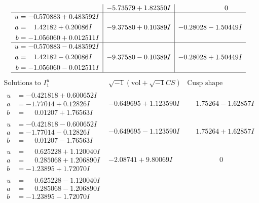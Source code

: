 \documentclass[1p]{elsarticle_modified}
\theoremstyle{definition}
\newcommand{\I}{\sqrt{-1}}
\begin{document}
$$\begin{array}{c|c|c}
 & -5.73579 + 1.82350 I & \phantom{-0.000000 } 0 \\ \hline\begin{aligned}
u &= -0.570883 + 0.483592 I \\
a &= \phantom{-}1.42182 + 0.20086 I \\
b &= -1.056060 + 0.012511 I\end{aligned}
 & -9.37580 + 0.10389 I & -0.28028 - 1.50449 I \\ \hline\begin{aligned}
u &= -0.570883 - 0.483592 I \\
a &= \phantom{-}1.42182 - 0.20086 I \\
b &= -1.056060 - 0.012511 I\end{aligned}
 & -9.37580 - 0.10389 I & -0.28028 + 1.50449 I\\
 \hline 
 \end{array}$$\newpage$$\begin{array}{c|c|c}  
\text{Solutions to }I^u_{1}& \I (\text{vol} + \sqrt{-1}CS) & \text{Cusp shape}\\
 \hline 
\begin{aligned}
u &= -0.421818 + 0.600652 I \\
a &= -1.77014 + 0.12826 I \\
b &= \phantom{-}0.01207 + 1.76563 I\end{aligned}
 & -0.649695 + 1.123590 I & \phantom{-}1.75264 - 1.62857 I \\ \hline\begin{aligned}
u &= -0.421818 - 0.600652 I \\
a &= -1.77014 - 0.12826 I \\
b &= \phantom{-}0.01207 - 1.76563 I\end{aligned}
 & -0.649695 - 1.123590 I & \phantom{-}1.75264 + 1.62857 I \\ \hline\begin{aligned}
u &= \phantom{-}0.625228 + 1.120040 I \\
a &= \phantom{-}0.285068 + 1.206890 I \\
b &= -1.23895 + 1.72070 I\end{aligned}
 & -2.08741 + 9.80069 I & \phantom{-0.000000 } 0 \\ \hline\begin{aligned}
u &= \phantom{-}0.625228 - 1.120040 I \\
a &= \phantom{-}0.285068 - 1.206890 I \\
b &= -1.23895 - 1.72070 I\end{aligned}

\end{array}$$
\end{document}
